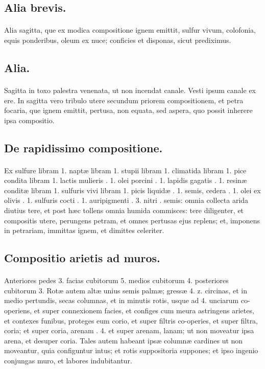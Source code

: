 \documentclass[a4paper, 11pt, oneside, polutonikogreek, italian]{article}
\begin{document}
\subsection{Alia brevis.}
\paragraph{}
Alia sagitta, que ex modica compositione ignem emittit, sulfur vivum, colofonia, equis ponderibus, oleum ex nuce; conficies et disponas, sicut prediximus.

\subsection{Alia.}
\paragraph{}
Sagitta in toxo palestra venenata, ut non incendat canale. Vesti ipsum canale ex ere. In sagitta vero tribulo utere secundum priorem compositionem, et petra focaria, que ignem emittit, pertusa, non equata, sed aspera, quo possit inherere ipsa compositio.

\subsection{De rapidissimo compositione.}
\paragraph{}
Ex sulfure libram 1. naptæ libram 1. stupii libram 1. climatida libram 1. pice condita libram 1. lactis mulieris \roundz. 1. olei porcini \roundz. 1. lapidis gagatis \roundz. 1. resinæ conditæ libram 1. sulfuris vivi libram 1. picis liquidæ \roundz. 1. semis, cedera \roundz. 1. olei ex olivis \roundz. 1. sulfuris cocti \roundz. 1. auripigmenti \roundz. 3. nitri \roundz. semis: omnia collecta arida diutius tere, et post hæc tollens omnia humida commisces: tere diligenter, et compositis utere, perungens petram, et omnes pertusas ejus replens; et, imponens in petrariam, immittas ignem, et dimittes celeriter.

\subsection{Compositio arietis ad muros.}
\paragraph{}
Anteriores pedes 3. facias cubitorum 5. medios cubitorum 4. posteriores cubitorum 3. Rotæ autem altæ unius semis palmæ; gressæ 4. z. circinas, et in medio pertundis, secas columnas, et in minutis rotis, usque ad 4. unciarum co-operiens, et super connexionem facies, et configes cum meura astringens arietes, et contexes funibus, proteges eum corio, et super filtris co-operies, et super filtra, coria; et super coria, arenam \roundz. 4. et super arenam, lanam; ut non moveatur ipsa arena, et desuper coria. Tales autem habeant ipsæ columnæ cardines ut non moveantur, quia configuntur intus; et rotis suppositoria suppones; et ipso ingenio conjungas muro, et labores indubitantur.
\end{document}
